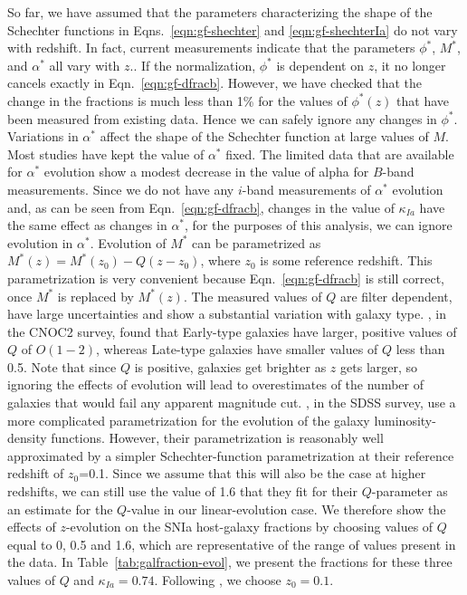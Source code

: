 \documentclass[preprint2]{aastex}    %
\begin{document}
So far, we have assumed that the parameters characterizing the shape of the Schechter functions in 
Eqns.~\ref{eqn:gf-shechter} and \ref{eqn:gf-shechterIa} do not vary with redshift. 
In fact, current measurements indicate that the parameters $\phi^{*}$, $M^{*}$, and $\alpha^{*}$ all
vary with $z$.\citep{bla03,fab07,li11-2,pol03}. 
If the normalization, $\phi^{*}$ is dependent on $z$, it no longer cancels exactly in Eqn.~\ref{eqn:gf-dfracb}.
However, we have checked that the change in the fractions is much less than 1\% for the values of 
$\phi^{*}(z)$ that have been measured from existing data. Hence we can safely ignore any 
changes in $\phi^{*}$. 
Variations in $\alpha^{*}$ affect the shape of the Schechter function at large values of $M$. 
Most studies have kept the value of $\alpha^{*}$ fixed.
The limited data that are available for $\alpha^{*}$ evolution \citep{pol03} show a modest
decrease in the value of alpha for $B$-band measurements. Since we do
not have any $i$-band measurements of $\alpha^{*}$ evolution and, as
can be seen from Eqn.~\ref{eqn:gf-dfracb}, changes in the value of
$\kappa_{Ia}$ have the same effect as changes in $\alpha^{*}$, for the
purposes of this analysis, we can ignore evolution in $\alpha^{*}$.
Evolution of $M^{*}$ can be parametrized as
$M^{*}(z)=M^{*}(z_0)-Q(z-z_0)$, where $z_0$ is some reference
redshift.  This parametrization is very convenient because
Eqn.~\ref{eqn:gf-dfracb} is still correct, once $M^{*}$ is replaced by
$M^{*}(z)$.  The measured values of $Q$ are filter dependent, have
large uncertainties and show a substantial variation with galaxy
type. \cite{lin99}, in the CNOC2 survey, found that Early-type
galaxies have larger, positive values of $Q$ of $O(1-2)$, whereas
Late-type galaxies have smaller values of $Q$ less than 0.5.  Note
that since $Q$ is positive, galaxies get brighter as $z$ gets larger,
so ignoring the effects of evolution will lead to overestimates of the
number of galaxies that would fail any apparent magnitude cut.
\cite{bla03}, in the SDSS survey, use a more complicated
parametrization for the evolution of the galaxy luminosity-density
functions.  However, their parametrization is reasonably well
approximated by a simpler Schechter-function parametrization at their
reference redshift of $z_0$=0.1.  Since we assume that this will also
be the case at higher redshifts, we can still use the value of 1.6 that they
fit for their $Q$-parameter as an estimate for the $Q$-value in our
linear-evolution case.  We therefore show the effects of $z$-evolution
on the SNIa host-galaxy fractions by choosing values of $Q$ equal to
0, 0.5 and 1.6, which are representative of the range of values
present in the data.  In Table~\ref{tab:galfraction-evol}, we present
the fractions for these three values of $Q$ and $\kappa_{Ia}=0.74$.
Following \cite{bla03}, we choose $z_0=0.1$.
  
\end{document}
